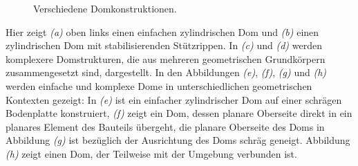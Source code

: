 \begin{figure}[ht]
    \centering 
\caption{Verschiedene Domkonstruktionen.} 
\label{im:domes2}
\end{figure} 

Hier zeigt \textit{(a)} oben links einen einfachen zylindrischen Dom und \textit{(b)} einen zylindrischen Dom mit stabilisierenden St\"utzrippen. In \textit{(c)} und \textit{(d)} werden komplexere Domstrukturen, die aus mehreren geometrischen Grundk\"orpern zusammengesetzt sind, dargestellt. In den Abbildungen \textit{(e)}, \textit{(f)}, \textit{(g)} und \textit{(h)} werden einfache und komplexe Dome in unterschiedlichen geometrischen Kontexten gezeigt: In \textit{(e)} ist ein einfacher zylindrischer Dom auf einer schr\"agen Bodenplatte konstruiert, \textit{(f)} zeigt ein Dom, dessen planare Oberseite direkt in ein planares Element des Bauteils \"ubergeht, die planare Oberseite des Doms in Abbildung \textit{(g)} ist bez\"uglich der Ausrichtung des Doms schr\"ag geneigt. Abbildung \textit{(h)} zeigt einen Dom, der Teilweise mit der Umgebung verbunden ist.  
 

